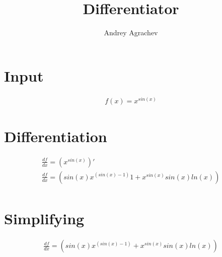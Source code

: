 \documentclass[]{article}
\title{Differentiator}
\author{Andrey Agrachev}
\begin{document}
\maketitle
\section{Input}
\begin{gather*}
f(x) = {x}^{sin(x)}
\end{gather*}
\section{Differentiation}
\begin{gather*}
\frac{df}{dx}=({x}^{sin(x)})'\\
\frac{df}{dx}=(sin(x){x}^{(sin(x)-1)}1+{x}^{sin(x)}sin(x)ln(x))\\
\end{gather*}
\section{Simplifying}
\begin{gather*}
\frac{df}{dx}=(sin(x){x}^{(sin(x)-1)}+{x}^{sin(x)}sin(x)ln(x))
\end{gather*}
\end{document}

